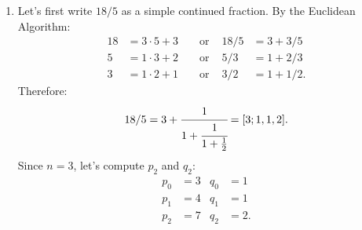 \begin{solution}
\begin{enumerate}
\begin{align*}
        \end{align*}
        Therefore:
        $$364/227 = 
        1 + \cfrac{1}{
            1 + \cfrac{1}{
                1 + \cfrac{1}{
                    1 + \cfrac{1}{
                        1 + \cfrac{1}{
                            10 + \cfrac{1}{
                                1 + \frac{1}{
                                    3
                                }
                                }
                            }
                        }
                    }
                }
            } = [1; 1, 1, 1, 1, 10, 1, 3].$$ 
        Since $n = 7$, let's compute $p_6$ and $q_6$:
        \begin{align*}
            p_0 &= 1 & q_0 &= 1 \\
            p_1 &= 2 & q_1 &= 1 \\
            p_2 &= 3 & q_2 &= 2 \\
            p_3 &= 5 & q_3 &= 3 \\
            p_4 &= 8 & q_4 &= 5 \\
            p_5 &= 85 & q_5 &= 53 \\
            p_6 &= 93 & q_6 &= 58.
        \end{align*}
        Hence, we obtain the equation $364\cdot 58 - 227 \cdot 93 = 1$, or equivalently,
        $$364\cdot 58 + 227 \cdot (-93) = 1.$$
        Thus, we get the particular solution $x = 58$, $y = -93$. It follows that the general solution is $x = 58 + 227t$, $y = -93 - 364t$ where $t$ is an integer.
        \item Let's first write $18/5$ as a simple continued fraction. By the Euclidean Algorithm:
        \begin{align*}
            18 &= 3\cdot 5 + 3 & &\text{ or } & 18/5 &= 3 + 3/5 \\
            5 &= 1\cdot 3 + 2 & &\text{ or } & 5/3 &= 1 + 2/3 \\
            3 &= 1\cdot 2 + 1 & &\text{ or } & 3/2 &= 1 + 1/2.
        \end{align*}
        Therefore:
        $$18/5 = 3 + \cfrac{1}{
                1 + \cfrac{1}{
                    1 + \frac{1}{2}
                }
            }
        = [3; 1, 1, 2].$$
        Since $n = 3$, let's compute $p_2$ and $q_2$:
        \begin{align*}
            p_0 &= 3 & q_0 &= 1 \\
            p_1 &= 4 & q_1 &= 1 \\
            p_2 &= 7 & q_2 &= 2.
        \end{align*}

\end{enumerate}
\end{solution}
